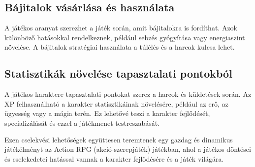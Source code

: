 \subsection{Bájitalok vásárlása és használata}

 A játékos aranyat szerezhet a játék során, amit bájitalokra is fordíthat. Azok különböző hatásokkal rendelkeznek, például sebzés gyógyítása vagy energiaszint növelése. A bájitalok stratégiai használata a túlélés és a harcok kulcsa lehet.

\subsection{Statisztikák növelése tapasztalati pontokból}

 A játékos karaktere tapasztalati pontokat szerez a harcok és küldetések során. Az XP felhasználható a karakter statisztikáinak növelésére, például az erő, az ügyesség vagy a mágia terén. Ez lehetővé teszi a karakter fejlődését, specializálását és ezzel a játékmenet testreszabását.

Ezen cselekvési lehetőségek együttesen teremtenek egy gazdag és dinamikus játékélményt az Action RPG (akció-szerepjáték) játékban, ahol a játékos döntései és cselekedetei hatással vannak a karakter fejlődésére és a játék világára.



